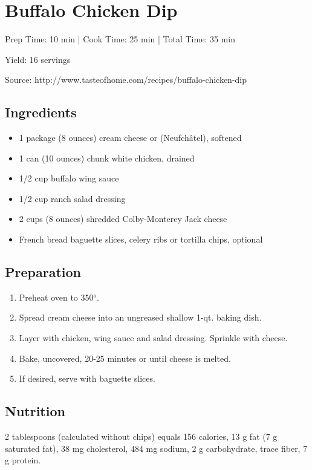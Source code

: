 \section{Buffalo Chicken Dip}

\begin{center}
Prep Time: 10 min |
Cook Time: 25 min |
Total Time: 35 min

\noindent Yield: 16 servings

\vspace{1em}

Source: http://www.tasteofhome.com/recipes/buffalo-chicken-dip
\end{center}

\subsection{Ingredients}
\begin{multicols}{2}
\begin{itemize}
    \item 1 package (8 ounces) cream cheese or (Neufch\^{a}tel), softened
    \item 1 can (10 ounces) chunk white chicken, drained
    \item 1/2 cup buffalo wing sauce
    \item 1/2 cup ranch salad dressing
    \item 2 cups (8 ounces) shredded Colby-Monterey Jack cheese
    \item French bread baguette slices, celery ribs or tortilla chips, optional
\end{itemize}
\end{multicols}

\subsection{Preparation}
\begin{enumerate}
    \item Preheat oven to 350$^o$.
    \item Spread cream cheese into an ungreased shallow 1-qt. baking dish.
    \item Layer with chicken, wing sauce and salad dressing. Sprinkle with cheese.
    \item Bake, uncovered, 20-25 minutes or until cheese is melted.
    \item If desired, serve with baguette slices.
\end{enumerate}

\subsection{Nutrition}
2 tablespoons (calculated without chips) equals 156 calories, 13 g fat (7 g saturated fat), 38 mg cholesterol, 484 mg sodium, 2 g carbohydrate, trace fiber, 7 g protein.
